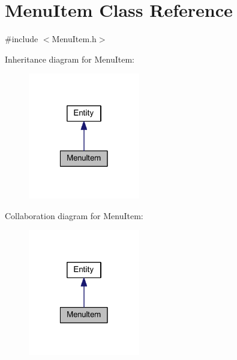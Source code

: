 \hypertarget{class_menu_item}{
\section{MenuItem Class Reference}
\label{dc/d9c/class_menu_item}
}


{\ttfamily \#include $<$MenuItem.h$>$}



Inheritance diagram for MenuItem:
\nopagebreak
\begin{figure}[H]
\begin{center}
\leavevmode
\includegraphics[width=138pt]{da/d89/class_menu_item__inherit__graph}
\end{center}
\end{figure}


Collaboration diagram for MenuItem:
\nopagebreak
\begin{figure}[H]
\begin{center}
\leavevmode
\includegraphics[width=138pt]{d7/d7f/class_menu_item__coll__graph}
\end{center}
\end{figure}
